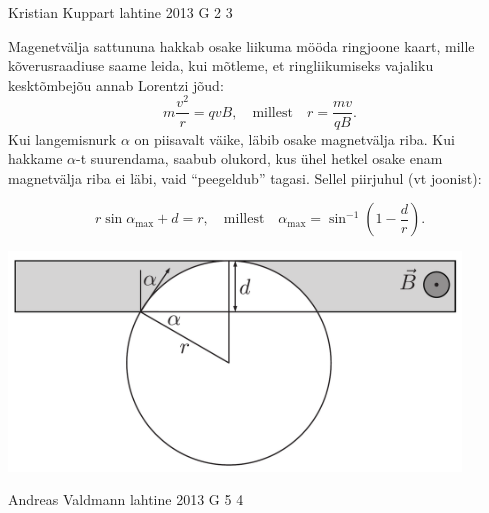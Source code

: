 \documentclass[11pt]{article}
\begin{document}
{%
{Kristian Kuppart} %
{lahtine} %
{2013} %
{G 2} %
{3} %
{

\ifSolution
Magenetvälja sattununa hakkab osake liikuma mööda ringjoone kaart, mille kõverusraadiuse saame leida, kui mõtleme, et ringliikumiseks vajaliku kesktõmbejõu annab Lorentzi jõud:
\[m\frac{v^2}{r}=qvB, \quad \text{millest} \quad r=\frac{mv}{qB}.\]
Kui langemisnurk $\alpha$ on piisavalt väike, läbib osake magnetvälja riba. Kui hakkame $\alpha$-t
suurendama, saabub olukord, kus ühel hetkel osake enam magnetvälja riba ei läbi, vaid ``peegeldub'' tagasi. Sellel piirjuhul (vt joonist):

\[r\sin\alpha_\text{max}+d=r, \quad \text{millest} \quad \alpha_\text{max}=\sin^{-1}\left(1-\frac{d}{r}\right).\]

\begin{center}
\includegraphics[width=0.9\textwidth]{2013-lahg-02-magPeegLah.pdf}
\end{center}
\fi
}

{Andreas Valdmann} %
{lahtine} %
{2013} %
{G 5} %
{4} %
{

}}
\end{document}

